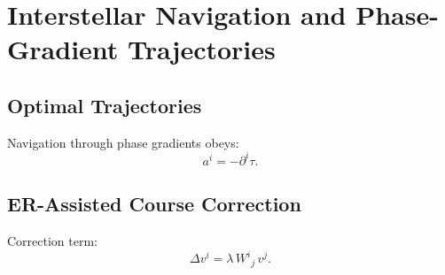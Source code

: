 \chapter{Interstellar Navigation and Phase-Gradient Trajectories}

\section{Optimal Trajectories}
Navigation through phase gradients obeys:
\[
a^i = -\partial^i\tau.
\]

\section{ER-Assisted Course Correction}
Correction term:
\[
\Delta v^i = \lambda\, W^i{}_j\, v^j.
\]

